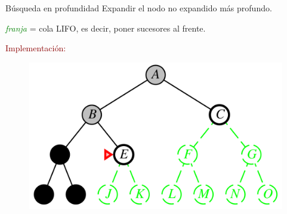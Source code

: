 
\begin{frame}{Búsqueda en profundidad}
Expandir el nodo no expandido más profundo.\\
\begin{center}
    \textit{\textcolor{Green}{franja}} = cola LIFO, es decir, poner sucesores al
    frente.\\
\end{center}{}

\textcolor{DarkRed}{Implementación:}
    \begin{figure}
        \includegraphics[scale=0.2]{48_chap3_pag48.png}
    \end{figure}
\end{frame}{}
